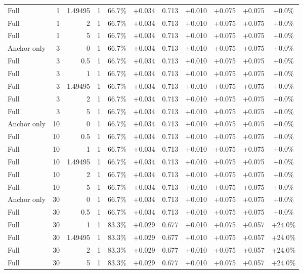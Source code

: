 \begin{table}[htbp]
\begin{tabular}{lrrrccccccc}
Full & 1 & 1.49495 & 1 & 66.7\% & +0.034 & 0.713 & +0.010 & +0.075 & +0.075 & +0.0\% \\
Full & 1 & 2 & 1 & 66.7\% & +0.034 & 0.713 & +0.010 & +0.075 & +0.075 & +0.0\% \\
Full & 1 & 5 & 1 & 66.7\% & +0.034 & 0.713 & +0.010 & +0.075 & +0.075 & +0.0\% \\
Anchor only & 3 & 0 & 1 & 66.7\% & +0.034 & 0.713 & +0.010 & +0.075 & +0.075 & +0.0\% \\
Full & 3 & 0.5 & 1 & 66.7\% & +0.034 & 0.713 & +0.010 & +0.075 & +0.075 & +0.0\% \\
Full & 3 & 1 & 1 & 66.7\% & +0.034 & 0.713 & +0.010 & +0.075 & +0.075 & +0.0\% \\
Full & 3 & 1.49495 & 1 & 66.7\% & +0.034 & 0.713 & +0.010 & +0.075 & +0.075 & +0.0\% \\
Full & 3 & 2 & 1 & 66.7\% & +0.034 & 0.713 & +0.010 & +0.075 & +0.075 & +0.0\% \\
Full & 3 & 5 & 1 & 66.7\% & +0.034 & 0.713 & +0.010 & +0.075 & +0.075 & +0.0\% \\
Anchor only & 10 & 0 & 1 & 66.7\% & +0.034 & 0.713 & +0.010 & +0.075 & +0.075 & +0.0\% \\
Full & 10 & 0.5 & 1 & 66.7\% & +0.034 & 0.713 & +0.010 & +0.075 & +0.075 & +0.0\% \\
Full & 10 & 1 & 1 & 66.7\% & +0.034 & 0.713 & +0.010 & +0.075 & +0.075 & +0.0\% \\
Full & 10 & 1.49495 & 1 & 66.7\% & +0.034 & 0.713 & +0.010 & +0.075 & +0.075 & +0.0\% \\
Full & 10 & 2 & 1 & 66.7\% & +0.034 & 0.713 & +0.010 & +0.075 & +0.075 & +0.0\% \\
Full & 10 & 5 & 1 & 66.7\% & +0.034 & 0.713 & +0.010 & +0.075 & +0.075 & +0.0\% \\
Anchor only & 30 & 0 & 1 & 66.7\% & +0.034 & 0.713 & +0.010 & +0.075 & +0.075 & +0.0\% \\
Full & 30 & 0.5 & 1 & 66.7\% & +0.034 & 0.713 & +0.010 & +0.075 & +0.075 & +0.0\% \\
Full & 30 & 1 & 1 & 83.3\% & +0.029 & 0.677 & +0.010 & +0.075 & +0.057 & +24.0\% \\
Full & 30 & 1.49495 & 1 & 83.3\% & +0.029 & 0.677 & +0.010 & +0.075 & +0.057 & +24.0\% \\
Full & 30 & 2 & 1 & 83.3\% & +0.029 & 0.677 & +0.010 & +0.075 & +0.057 & +24.0\% \\
Full & 30 & 5 & 1 & 83.3\% & +0.029 & 0.677 & +0.010 & +0.075 & +0.057 & +24.0\% \\

\end{tabular}
\end{table}
